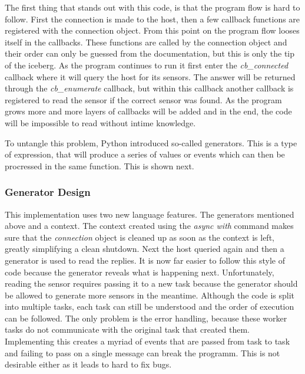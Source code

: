 
The first thing that stands out with this code, is that the program flow is hard to follow. First the connection is made to the host, then a few callback functions are registered with the connection object. From this point on the program flow looses itself in the callbacks. These functions are called by the connection object and their order can only be guessed from the documentation, but this is only the tip of the iceberg. As the program continues to run it first enter the \textit{cb\_connected} callback where it will query the host for its sensors. The answer will be returned through the \textit{cb\_enumerate} callback, but within this callback another callback is registered to read the sensor if the correct sensor was found. As the program grows more and more layers of callbacks will be added and in the end, the code will be impossible to read without intime knowledge.

To untangle this problem, Python introduced so-called generators. This is a type of expression, that will produce a series of values or events which can then be procressed in the same function. This is shown next.

\subsubsection{Generator Design}


This implementation uses two new language features. The generators mentioned above and a context. The context created using the \textit{async with} command makes sure that the \textit{connection} object is cleaned up as soon as the context is left, greatly simplifying a clean shutdown. Next the host queried again and then a generator is used to read the replies. It is now far easier to follow this style of code because the generator reveals what is happening next. Unfortunately, reading the sensor requires passing it to a new task because the generator should be allowed to generate more sensors in the meantime. Although the code is split into multiple tasks, each task can still be understood and the order of execution can be followed. The only problem is the error handling, because these worker tasks do not communicate with the original task that created them. Implementing this creates a myriad of events that are passed from task to task and failing to pass on a single message can break the programm. This is not desirable either as it leads to hard to fix bugs.

